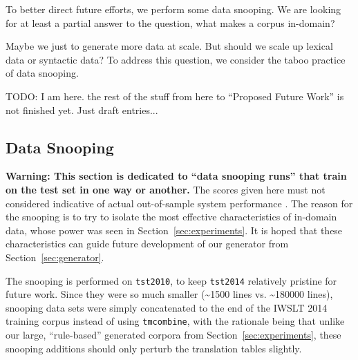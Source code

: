 {To better direct future efforts, we perform some data snooping.
We are looking for at least a partial answer to the question, what makes a corpus in-domain?

Maybe we just to generate more data at scale. 
But should we scale up lexical data or syntactic data? 
To address this question, we consider the taboo practice of data snooping.



\noindent\makebox[\linewidth]{\rule{\paperwidth}{0.4pt}}
TODO: I am here. the rest of the stuff from here to ``Proposed Future Work'' is not finished yet. Just draft entries...


\subsection{Data Snooping}
\textbf{Warning: This section is dedicated to ``data snooping runs'' that train on the test set in one way or another.}
The scores given here must not considered indicative of actual out-of-sample system performance .
The reason for the snooping is to try to isolate the most effective characteristics of in-domain data, whose power was seen in Section~\ref{sec:experiments}.
It is hoped that these characteristics can guide future development of our generator from Section~\ref{sec:generator}.

The snooping is performed on {\small \tt tst2010}, to keep {\small \tt tst2014} relatively pristine for future work.
Since they were so much smaller (\textasciitilde 1500 lines vs. \textasciitilde 180000 lines), snooping data sets were simply concatenated to the end of the IWSLT 2014 training corpus instead of using {\small \tt tmcombine}, with the rationale being that unlike our large, ``rule-based'' generated corpora from Section~\ref{sec:experiments}, these snooping additions should only perturb the translation tables slightly.



}
